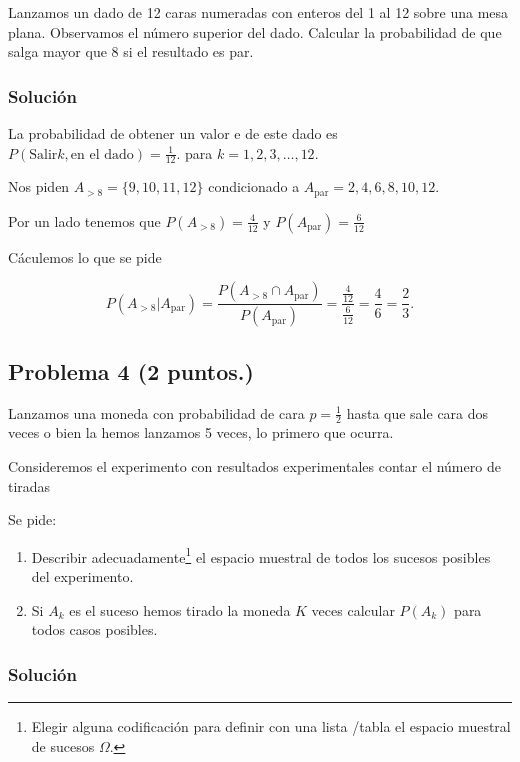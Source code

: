\documentclass[
]{article}
\providecommand{\tightlist}{%
  \setlength{\itemsep}{0pt}\setlength{\parskip}{0pt}}
\begin{document}
Lanzamos un dado de 12 caras numeradas con enteros del 1 al 12 sobre una
mesa plana. Observamos el número superior del dado. Calcular la
probabilidad de que salga mayor que 8 si el resultado es par.

\hypertarget{soluciuxf3n-2}{%
\subsubsection{Solución}\label{soluciuxf3n-2}}

La probabilidad de obtener un valor e de este dado es
\(P(\mbox{Salir} k ,\mbox{en el dado})=\frac{1}{12}.\) para
\(k=1,2,3,\ldots,12.\)

Nos piden \(A_{> 8}=\{9,10,11,12\}\) condicionado a
\(A_{\mbox{par}}={2,4,6,8,10,12}\).

Por un lado tenemos que \(P(A_{> 8})=\frac{4}{12}\) y
\(P(A_{\mbox{par}})=\frac{6}{12}\)

Cáculemos lo que se pide

\[
P\left(A_{> 8}| A_{\mbox{par}}\right)=
\frac{ P\left(A_{> 8}\cap A_{\mbox{par}}\right)}{P\left(A_{\mbox{par}}\right)}=
\frac{\frac{4}{12}}{\frac{6}{12}}=\frac{4}{6}=\frac{2}{3}.
\]

\hypertarget{problema-4}{%
\subsection{\texorpdfstring{Problema 4
(\textbf{2 puntos.})}{Problema 4 ()}}\label{problema-4}}

Lanzamos una moneda con probabilidad de cara \(p=\frac{1}{2}\) hasta que
sale cara dos veces o bien la hemos lanzamos 5 veces, lo primero que
ocurra.

Consideremos el experimento con resultados experimentales contar el
número de tiradas

Se pide:

\begin{enumerate}
\def\labelenumi{\alph{enumi}.}
\tightlist
\item
  Describir
  adecuadamente\footnote{Elegir alguna codificación para definir con una lista /tabla el espacio muestral de sucesos $\Omega$.}
  el espacio muestral de todos los sucesos posibles del experimento.
\item
  Si \(A_k\) es el suceso hemos tirado la moneda \(K\) veces calcular
  \(P(A_k)\) para todos casos posibles.
\end{enumerate}

\hypertarget{soluciuxf3n-3}{%
\subsubsection{Solución}\label{soluciuxf3n-3}}
\end{document}
